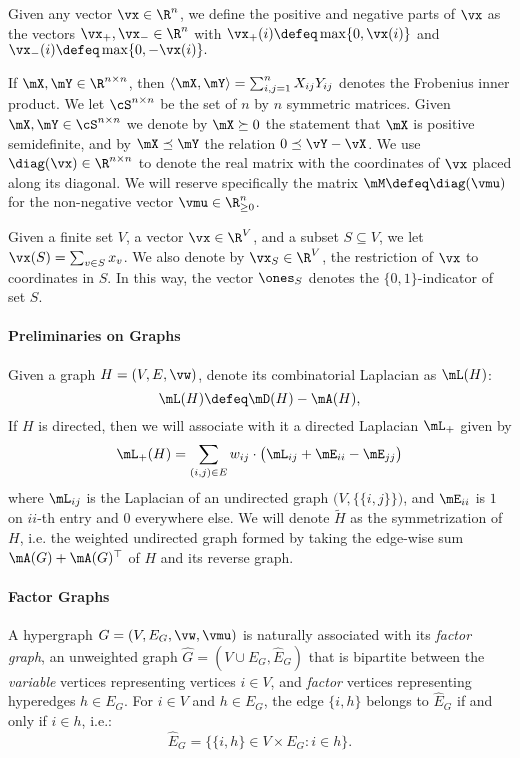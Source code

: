 \documentclass[letterpaper]{article}
\begin{document}
Given any vector $\vx \in \R^n$, we define the positive and negative parts of $\vx$ as the vectors $\vx_+,\vx_-\in \R^n$ with
        $\vx_+(i) \defeq  \max\{0,\vx(i)\}$ and
        $\vx_-(i) \defeq  \max\{0,-\vx(i)\}.$

If $\mX, \mY \in \R^{n \times n}$, then $\langle \mX, \mY \rangle = \sum_{i,j=1}^n X_{ij} Y_{ij}$ denotes the Frobenius inner product. We let $\cS^{n \times n}$ be the set of $n$ by $n$ symmetric matrices. Given $\mX,\mY \in \cS^{n \times n}$ we denote by $\mX \succeq 0$ the statement that $\mX$ is positive semidefinite, and by $\mX \preceq \mY$ the relation $0 \preceq \vY-\vX$.  We use $\diag(\vx) \in \R^{n \times n}$ to denote the real matrix with the coordinates of $\vx$ placed along its diagonal. We will reserve specifically the matrix $\mM \defeq \diag(\vmu)$ for the non-negative vector $\vmu \in \R^n_{\geq 0}$.

Given a finite set $V$, a vector $\vx \in \R^V$, and a subset $S \subseteq V$, we let $\vx(S) = \sum_{v\in S} x_v$. We also denote by $\vx_S \in \R^V$, the restriction of $\vx$ to coordinates in $S$.
In this way, the vector $\ones_S$ denotes the $\{0,1\}$-indicator of set $S$.


\paragraph{Preliminaries on Graphs}

Given a graph $H = (V, E, \vw)$, denote its combinatorial Laplacian as $\mL(H)$:
\begin{equation*}
\mL(H) \defeq \mD(H) - \mA(H),
\end{equation*}
If $H$ is directed, then we will associate with it a directed Laplacian $\mL_+$ given by
\begin{equation*}
\mL_{+}(H) = \sum_{(i,j) \in E} w_{ij} \cdot \big( \mL_{ij} + \mE_{ii} - \mE_{jj} \big)
\end{equation*}
where $\mL_{ij}$ is the Laplacian of an undirected graph $\big(V, \big\{ \{ i, j \} \big\} \big)$, and $\mE_{ii}$ is $1$ on $ii$-th entry and $0$ everywhere else. We will denote $\tilde{H}$ as the symmetrization of $H$, i.e. the weighted undirected graph formed by taking the edge-wise sum ${\mA(G) + \mA(G)^{\top}}$ of $H$ and its reverse graph.




\paragraph{Factor Graphs} A hypergraph $G = (V, E_G, \vw, \vmu)$ is naturally associated with its {\it factor graph}, an unweighted graph $\hat{G} = (V \cup E_G, \hat{E}_G)$ that is bipartite between the \emph{variable} vertices representing vertices $i \in V$, and \emph{factor} vertices representing hyperedges $h \in E_G$. For $i \in V$ and $h \in E_G$, the edge $\{ i, h \}$ belongs to $\hat{E}_G$ if and only if $i \in h$, i.e.:
\begin{equation*}
\hat{E}_G = \{ \{ i, h \} \in V \times E_G : i \in h \}.
\end{equation*}
\end{document}

